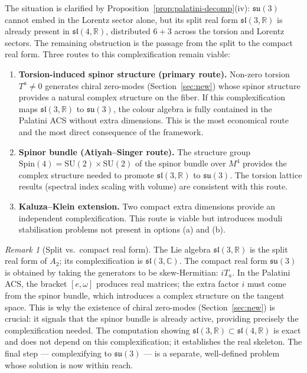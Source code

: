 \documentclass[12pt,a4paper]{article}
\theoremstyle{plain}
\theoremstyle{definition}
\theoremstyle{remark}
\newtheorem{remark}[theorem]{Remark}
\begin{document}
\noindent The situation is clarified by Proposition~\ref{prop:palatini-decomp}(iv):
$\mathfrak{su}(3)$ cannot embed in the Lorentz sector alone, but its split
real form $\mathfrak{sl}(3,\mathbb{R})$ is already present in $\mathfrak{sl}(4,\mathbb{R})$,
distributed $6+3$ across the torsion and Lorentz sectors.  The remaining
obstruction is the passage from the split to the compact real form.
Three routes to this complexification remain viable:

\begin{enumerate}[label=(\alph*)]
  \item \textbf{Torsion-induced spinor structure (primary route).}
    Non-zero torsion $T^a \neq 0$ generates chiral zero-modes
    (Section~\ref{sec:new}) whose spinor structure provides a natural
    complex structure on the fiber.  If this complexification maps
    $\mathfrak{sl}(3,\mathbb{R})$ to $\mathfrak{su}(3)$, the colour
    algebra is fully contained in the Palatini ACS without extra dimensions.
    This is the most economical route and the most direct
    consequence of the framework.

  \item \textbf{Spinor bundle (Atiyah--Singer route).}
    The structure group $\mathrm{Spin}(4) = \mathrm{SU}(2) \times \mathrm{SU}(2)$
    of the spinor bundle over $M^4$ provides the complex structure
    needed to promote $\mathfrak{sl}(3,\mathbb{R})$ to $\mathfrak{su}(3)$.
    The torsion lattice results (spectral index scaling with volume)
    are consistent with this route.

  \item \textbf{Kaluza--Klein extension.}
    Two compact extra dimensions provide an independent complexification.
    This route is viable but introduces moduli stabilisation problems
    not present in options (a) and (b).
\end{enumerate}

\begin{remark}[Split vs.\ compact real form]\label{rem:split-compact}
The Lie algebra $\mathfrak{sl}(3,\mathbb{R})$ is the split real form of $A_2$;
its complexification is $\mathfrak{sl}(3,\mathbb{C})$.
The compact real form $\mathfrak{su}(3)$ is obtained by taking the generators
to be skew-Hermitian: $iT_a$.  In the Palatini ACS, the bracket $[e,\omega]$
produces real matrices; the extra factor $i$ must come from the spinor bundle,
which introduces a complex structure on the tangent space.  This is why
the existence of chiral zero-modes (Section~\ref{sec:new}) is crucial:
it signals that the spinor bundle is already active, providing precisely
the complexification needed.  The computation showing
$\mathfrak{sl}(3,\mathbb{R}) \subset \mathfrak{sl}(4,\mathbb{R})$ is exact
and does not depend on this complexification; it establishes the real skeleton.
The final step --- complexifying to $\mathfrak{su}(3)$ --- is a separate,
well-defined problem whose solution is now within reach.
\end{remark}
\end{document}
